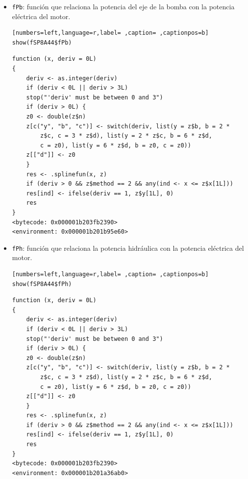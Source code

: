 \begin{itemize}
\begin{itemize}
\begin{verbatim}
function (x, deriv = 0L) 
{
    deriv <- as.integer(deriv)
    if (deriv < 0L || deriv > 3L) 
	stop("'deriv' must be between 0 and 3")
    if (deriv > 0L) {
	z0 <- double(z$n)
	z[c("y", "b", "c")] <- switch(deriv, list(y = z$b, b = 2 * 
	    z$c, c = 3 * z$d), list(y = 2 * z$c, b = 6 * z$d, 
	    c = z0), list(y = 6 * z$d, b = z0, c = z0))
	z[["d"]] <- z0
    }
    res <- .splinefun(x, z)
    if (deriv > 0 && z$method == 2 && any(ind <- x <= z$x[1L])) 
	res[ind] <- ifelse(deriv == 1, z$y[1L], 0)
    res
}
<bytecode: 0x000001b203fb2390>
<environment: 0x000001b2046bf238>
\end{verbatim}

\item \texttt{fPb}: función que relaciona la potencia del eje de la bomba con la potencia eléctrica del motor.
\begin{lstlisting}[numbers=left,language=r,label= ,caption= ,captionpos=b]
show(fSP8A44$fPb)
\end{lstlisting}

\begin{verbatim}
function (x, deriv = 0L) 
{
    deriv <- as.integer(deriv)
    if (deriv < 0L || deriv > 3L) 
	stop("'deriv' must be between 0 and 3")
    if (deriv > 0L) {
	z0 <- double(z$n)
	z[c("y", "b", "c")] <- switch(deriv, list(y = z$b, b = 2 * 
	    z$c, c = 3 * z$d), list(y = 2 * z$c, b = 6 * z$d, 
	    c = z0), list(y = 6 * z$d, b = z0, c = z0))
	z[["d"]] <- z0
    }
    res <- .splinefun(x, z)
    if (deriv > 0 && z$method == 2 && any(ind <- x <= z$x[1L])) 
	res[ind] <- ifelse(deriv == 1, z$y[1L], 0)
    res
}
<bytecode: 0x000001b203fb2390>
<environment: 0x000001b201b95e60>
\end{verbatim}

\item \texttt{fPh}: función que relaciona la potencia hidráulica con la potencia eléctrica del motor.
\begin{lstlisting}[numbers=left,language=r,label= ,caption= ,captionpos=b]
show(fSP8A44$fPh)
\end{lstlisting}

\begin{verbatim}
function (x, deriv = 0L) 
{
    deriv <- as.integer(deriv)
    if (deriv < 0L || deriv > 3L) 
	stop("'deriv' must be between 0 and 3")
    if (deriv > 0L) {
	z0 <- double(z$n)
	z[c("y", "b", "c")] <- switch(deriv, list(y = z$b, b = 2 * 
	    z$c, c = 3 * z$d), list(y = 2 * z$c, b = 6 * z$d, 
	    c = z0), list(y = 6 * z$d, b = z0, c = z0))
	z[["d"]] <- z0
    }
    res <- .splinefun(x, z)
    if (deriv > 0 && z$method == 2 && any(ind <- x <= z$x[1L])) 
	res[ind] <- ifelse(deriv == 1, z$y[1L], 0)
    res
}
<bytecode: 0x000001b203fb2390>
<environment: 0x000001b201a36ab0>
\end{verbatim}


\end{itemize}
\end{itemize}
